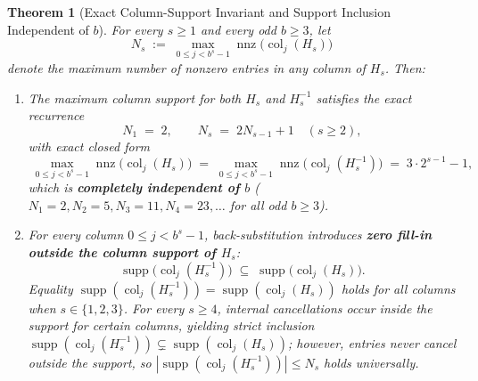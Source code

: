 \documentclass[11pt,a4paper]{article}
\theoremstyle{plain}
\newtheorem{theorem}{Theorem}[section]
\theoremstyle{definition}
\newcommand{\supp}{\operatorname{supp}}
\newcommand{\nnz}{\operatorname{nnz}}
\newcommand{\col}{\operatorname{col}}
\begin{document}
\begin{theorem}[Exact Column-Support Invariant and Support Inclusion Independent of $b$]\label{thm:T3}
For every $s \ge 1$ and every odd $b \ge 3$, let
\[
N_s \;:=\; \max_{0 \le j < b^s - 1} \nnz\big(\col_j(H_s)\big)
\]
denote the maximum number of nonzero entries in any column of $H_s$. Then:
\begin{enumerate}[label=(\alph*)]
\item The maximum column support for both $H_s$ and $H_s^{-1}$ satisfies the exact recurrence
\begin{equation}\label{eq:N_s-rec}
N_1 \;=\; 2, \qquad N_s \;=\; 2 N_{s-1} + 1 \quad (s \ge 2),
\end{equation}
with exact closed form
\begin{equation}\label{eq:N_s-closed}
\boxed{\; \max_{0 \le j < b^s - 1} \nnz\big(\col_j(H_s)\big) \;=\; \max_{0 \le j < b^s - 1} \nnz\big(\col_j(H_s^{-1})\big) \;=\; 3 \cdot 2^{s-1} - 1, \;}
\end{equation}
which is \textbf{completely independent of $b$} ($N_1 = 2, N_2 = 5, N_3 = 11, N_4 = 23, \dots$ for all odd $b \ge 3$).
\item For every column $0 \le j < b^s - 1$, back-substitution introduces \textbf{zero fill-in outside the column support of $H_s$}:
\begin{equation}\label{eq:supp-inclusion}
\supp\big(\col_j(H_s^{-1})\big) \;\subseteq\; \supp\big(\col_j(H_s)\big).
\end{equation}
Equality $\supp(\col_j(H_s^{-1})) = \supp(\col_j(H_s))$ holds for all columns when $s \in \{1, 2, 3\}$. For every $s \ge 4$, internal cancellations occur inside the support for certain columns, yielding strict inclusion $\supp(\col_j(H_s^{-1})) \subsetneq \supp(\col_j(H_s))$; however, entries never cancel outside the support, so $|\supp(\col_j(H_s^{-1}))| \le N_s$ holds universally.
\end{enumerate}
\end{theorem}
\end{document}
